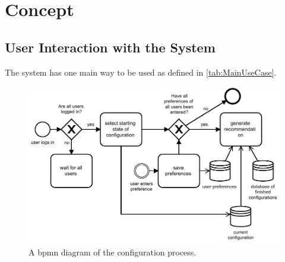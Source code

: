 \chapter{Concept}

\section{User Interaction with the System}
The system has one main way to be used as defined in \autoref{tab:MainUseCase}.

\begin{figure}
    \centering
    \includegraphics[width=1\textwidth]{./figures/bpmn_configuration_process_with_continious_recommendation.pdf}
    \caption{A bpmn diagram of the configuration process.}
    \label{fig:ConfigurationProcess}
\end{figure}

